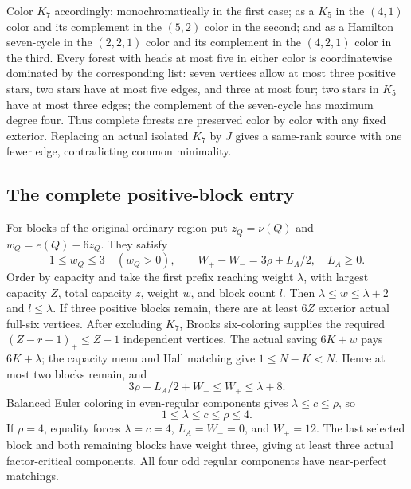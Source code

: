 \documentclass[11pt,a4paper]{article}
\theoremstyle{definition}
\begin{document}
Color $K_7$ accordingly: monochromatically in the first case; as a $K_5$ in the $(4,1)$ color and its complement in the $(5,2)$ color in the second; and as a Hamilton seven-cycle in the $(2,2,1)$ color and its complement in the $(4,2,1)$ color in the third. Every forest with heads at most five in either color is coordinatewise dominated by the corresponding list: seven vertices allow at most three positive stars, two stars have at most five edges, and three at most four; two stars in $K_5$ have at most three edges; the complement of the seven-cycle has maximum degree four. Thus complete forests are preserved color by color with any fixed exterior. Replacing an actual isolated $K_7$ by $J$ gives a same-rank source with one fewer edge, contradicting common minimality.

\subsection{The complete positive-block entry}
For blocks of the original ordinary region put $z_Q=\nu(Q)$ and $w_Q=e(Q)-6z_Q$. They satisfy
\[
 1\le w_Q\le3\quad(w_Q>0),\qquad
 W_+-W_-=3\rho+L_A/2,\quad L_A\ge0.
\]
Order by capacity and take the first prefix reaching weight $\lambda$, with largest capacity $Z$, total capacity $z$, weight $w$, and block count $l$. Then $\lambda\le w\le\lambda+2$ and $l\le\lambda$. If three positive blocks remain, there are at least $6Z$ exterior actual full-six vertices. After excluding $K_7$, Brooks six-coloring supplies the required $(Z-r+1)_+\le Z-1$ independent vertices. The actual saving $6K+w$ pays $6K+\lambda$; the capacity menu and Hall matching give $1\le N-K<N$. Hence at most two blocks remain, and
\[
 3\rho+L_A/2+W_-\le W_+\le\lambda+8.
\]
Balanced Euler coloring in even-regular components gives $\lambda\le c\le\rho$, so
\begin{equation}\label{eq:D6-entry}
 1\le\lambda\le c\le\rho\le4.
\end{equation}
If $\rho=4$, equality forces $\lambda=c=4$, $L_A=W_-=0$, and $W_+=12$. The last selected block and both remaining blocks have weight three, giving at least three actual factor-critical components. All four odd regular components have near-perfect matchings.
\end{document}
